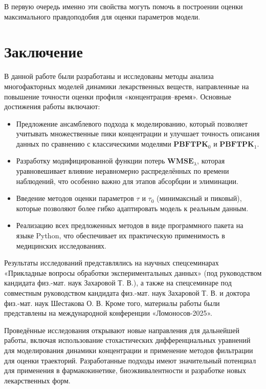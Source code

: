 \documentclass[oneside,senior,etd]{BYUPhys}
\begin{document}
В первую очередь именно эти свойства могуть помочь в построении оценки максимального правдоподобия для оценки параметров модели.

\newpage

\section{Заключение}

В данной работе были разработаны и исследованы методы анализа многофакторных моделей динамики лекарственных веществ, направленные на повышение точности оценки профиля «концентрация–время». Основные достижения работы включают:

\begin{itemize}
	\item Предложение ансамблевого подхода к моделированию, который позволяет учитывать множественные пики концентрации и улучшает точность описания данных по сравнению с классическими моделями $\textbf{PBFTPK}_0$ и $\textbf{PBFTPK}_1$.
	\item Разработку модифицированной функции потерь $\textbf{WMSE}_{\lambda}$, которая уравновешивает влияние неравномерно распределённых по времени наблюдений, что особенно важно для этапов абсорбции и элиминации.
	\item Введение методов оценки параметров $\tau$ и $\tau_0$ (минимаксный и пиковый), которые позволяют более гибко адаптировать модель к реальным данным.
	\item Реализацию всех предложенных методов в виде программного пакета на языке Python, что обеспечивает их практическую применимость в медицинских исследованиях.
\end{itemize}

Результаты исследований представлялись на научных спецсеминарах «Прикладные вопросы обработки экспериментальных данных» (под руководством кандидата физ.-мат. наук Захаровой Т. В.), а также на спецсеминаре под совместным руководством кандидата физ.-мат. наук Захаровой Т. В. и доктора физ.-мат. наук Шестакова О. В. Кроме того, материалы работы были представлены на международной конференции «Ломоносов-2025».

Проведённые исследования открывают новые направления для дальнейшей работы, включая использование стохастических дифференциальных уравнений для моделирования динамики концентрации и применение методов фильтрации для оценки траекторий. Разработанные подходы имеют значительный потенциал для применения в фармакокинетике, биоэквивалентности и разработке новых лекарственных форм.
\end{document}
